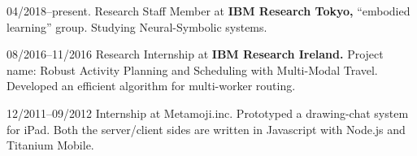 \documentclass[letterpaper,11pt]{article}
\begin{document}
\begin{CV}
\item[04/2018--present.] Research Staff Member at \textbf{IBM Research Tokyo,} ``embodied learning'' group.
 Studying Neural-Symbolic systems.

\item[08/2016--11/2016] Research Internship at \textbf{IBM Research Ireland.}
 Project name: Robust Activity Planning and Scheduling with Multi-Modal Travel.
 Developed an efficient algorithm for multi-worker routing.




\item[12/2011--09/2012] Internship at Metamoji.inc.  Prototyped a
  drawing-chat system for iPad. Both the server/client sides are
  written in Javascript with Node.js and Titanium Mobile.
\end{CV}
\end{document}
